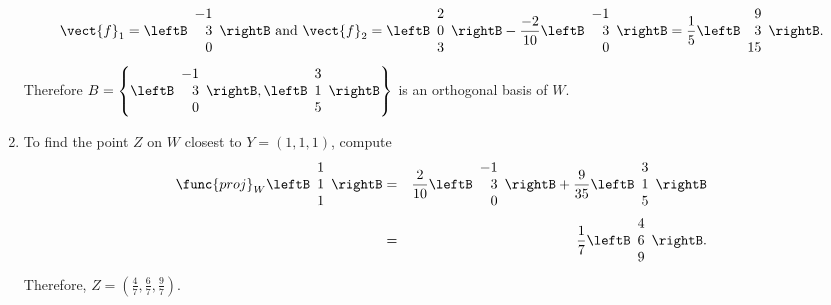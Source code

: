 \begin{solution}
\begin{enumerate}
\[ \vect{f}_1=\leftB\begin{array}{r} -1 \\ 3 \\ 0 \end{array}\rightB
\mbox{ and }
\vect{f}_2 =
\leftB\begin{array}{r} 2 \\ 0 \\ 3 \end{array}\rightB
-\frac{-2}{10}\leftB\begin{array}{r} -1 \\ 3 \\ 0 \end{array}\rightB
=\frac{1}{5}\leftB\begin{array}{r} 9 \\ 3 \\ 15 \end{array}\rightB.\]
Therefore
$B=\left\{ \leftB\begin{array}{r} -1 \\ 3 \\ 0 \end{array}\rightB,
\leftB\begin{array}{r} 3 \\ 1 \\ 5 \end{array}\rightB \right\}$ is
an orthogonal basis of $W$.
\item To find 
the point $Z$ on $W$ closest to $Y=(1,1,1)$, compute
\begin{eqnarray*}
\func{proj}_{W}\leftB\begin{array}{r} 1 \\ 1 \\ 1 \end{array}\rightB
& = &
\frac{2}{10} \leftB\begin{array}{r} -1 \\ 3 \\ 0 \end{array}\rightB
+ \frac{9}{35}\leftB\begin{array}{r} 3 \\ 1 \\ 5 \end{array}\rightB\\
& = & 
\frac{1}{7}\leftB\begin{array}{r} 4 \\ 6 \\ 9 \end{array}\rightB.
\end{eqnarray*}
Therefore, $Z=\left( \frac{4}{7}, \frac{6}{7}, \frac{9}{7}\right)$.
\end{enumerate}
\end{solution}